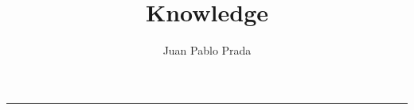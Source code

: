 \documentclass[a4paper,11pt]{article}
\title{Knowledge}
\author{Juan Pablo Prada}
\begin{document}
\maketitle
\begin{center}
	\rule{\textwidth}{1pt}
\end{center}

\noindent
\end{document}
